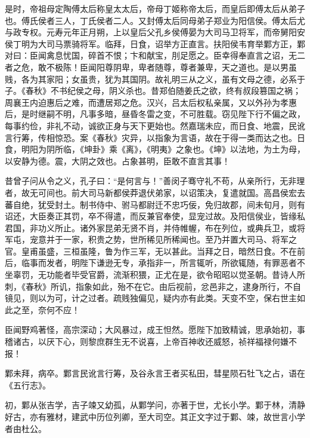 \documentclass[12pt,UTF8]{ctexbook}
\begin{document}
是时，帝祖母定陶傅太后称皇太太后，帝母丁姬称帝太后，而皇后即傅太后从弟子也。傅氏侯者三人，丁氏侯者二人。又封傅太后同母弟子郑业为阳信侯。傅太后尤与政专权。元寿元年正月朔，上以皇后父孔乡侯傅晏为大司马卫将军，而帝舅阳安侯丁明为大司马票骑将军。临拜，日食，诏举方正直言。扶阳侯韦育举鄴方正，鄴对曰：臣闻禽息忧国，碎首不恨；卞和献宝，刖足愿之。臣幸得奉直言之诏，无二者之危，敢不极陈！臣闻阳尊阴卑，卑者随尊，尊者兼卑，天之道也。是以男虽贱，各为其家阳；女虽贵，犹为其国阴。故礼明三从之义，虽有文母之德，必系于子。《春秋》不书纪侯之母，阴义杀也。昔郑伯随姜氏之欲，终有叔段篡国之祸；周襄王内迫惠后之难，而遭居郑之危。汉兴，吕太后权私亲属，又以外孙为孝惠后，是时继嗣不明，凡事多暗，昼昏冬雷之变，不可胜载。窃见陛下行不偏之政，每事约俭，非礼不动，诚欲正身与天下更始也。然嘉瑞未应，而日食、地震，民讹言行筹，传相惊恐。案《春秋》灾异，以指象为言语，故在于得一类而达之也。日食，明阳为阴所临，《坤卦》乘《离》，《明夷》之象也。《坤》以法地，为土为母，以安静为德。震，大阴之效也。占象甚明，臣敢不直言其事！



昔曾子问从令之义，孔子曰：“是何言与！”善闵子骞守礼不苟，从亲所行，无非理者，故无可间也。前大司马新都侯莽退伏弟家，以诏策决，复遣就国。高昌侯宏去蕃自绝，犹受封土。制书侍中、驸马都尉迁不忠巧佞，免归故郡，间未旬月，则有诏还，大臣奏正其罚，卒不得遣，而反兼官奉使，显宠过故。及阳信侯业，皆缘私君国，非功义所止。诸外家昆弟无贤不肖，并侍帷幄，布在列位，或典兵卫，或将军屯，宠意并于一家，积贵之势，世所稀见所稀闻也。至乃并置大司马、将军之官。皇甫虽盛，三桓虽隆，鲁为作三军，无以甚此。当拜之日，暗然日食。不在前后，临事而发者，明陛下谦逊无专，承指非一，所言辄听，所欲辄随，有罪恶者不坐辜罚，无功能者毕受官爵，流渐积猥，正尤在是，欲令昭昭以觉圣朝。昔诗人所刺，《春秋》所讥，指象如此，殆不在它。由后视前，忿邑非之，逮身所行，不自镜见，则以为可，计之过者。疏贱独偏见，疑内亦有此类。天变不空，保右世主如此之至，奈何不应！



臣闻野鸡著怪，高宗深动；大风暴过，成王怛然。愿陛下加致精诚，思承始初，事稽诸古，以厌下心，则黎庶群生无不说喜，上帝百神收还威怒，祯祥福禄何嫌不报！



鄴未拜，病卒。鄴言民讹言行筹，及谷永言王者买私田，彗星陨石牡飞之占，语在《五行志》。



初，鄴从张吉学，吉子竦又幼孤，从鄴学问，亦著于世，尤长小学。鄴于林，清静好古，亦有雅材，建武中历位列卿，至大司空。其正文字过于鄴、竦，故世言小学者由杜公。
\end{document}

